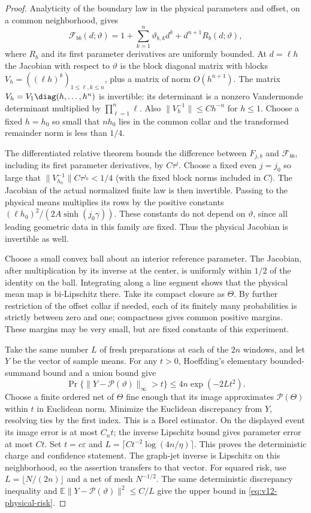 \begin{proof}
Analyticity of the boundary law in the physical parameters and offset,
on a common neighborhood, gives
\[
 \mathcal F_{bb}(d;\vartheta)
     =1+\sum_{k=1}^n\vartheta_{b,k}d^k
                            +d^{n+1}R_b(d;\vartheta),
\]
where $R_b$ and its first parameter derivatives are uniformly bounded.
At $d=\ell h$ the Jacobian with respect to $\vartheta$ is the block
diagonal matrix with blocks
$V_h=((\ell h)^k)_{1\le\ell,k\le n}$, plus a matrix of norm
$O(h^{n+1})$. The matrix $V_h=V_1\diag(h,\ldots,h^n)$ is
invertible: its determinant is a nonzero Vandermonde determinant
multiplied by $\prod_{\ell=1}^n\ell$. Also
$\|V_h^{-1}\|\le C h^{-n}$ for $h\le1$.
Choose a fixed $h=h_0$ so small that $nh_0$ lies in the common
collar and the transformed remainder norm is less than $1/4$.

The differentiated relative theorem bounds the difference between
$F_{j,b}$ and $\mathcal F_{bb}$, including its first parameter
derivatives, by $C\tau^j$. Choose a fixed even $j=j_0$ so large
that $\|V_{h_0}^{-1}\|C\tau^{j_0}<1/4$ (with the fixed block
norms included in $C$). The Jacobian of the actual normalized finite
law is then invertible. Passing to the physical means multiplies
its rows by the positive constants
$(\ell h_0)^2/(2A\sinh(j_0\gamma))$. These constants do not depend
on $\vartheta$, since all leading geometric data in this family are
fixed. Thus the physical Jacobian is invertible as well.

Choose a small convex ball about an interior reference parameter.
The Jacobian, after multiplication by its inverse at the center, is
uniformly within $1/2$ of the identity on the ball. Integrating along
a line segment shows that the physical mean map is bi-Lipschitz
there. Take its compact closure as $\Theta$. By further restriction
of the offset collar if needed, each of its finitely many probabilities
is strictly between zero and one; compactness gives common positive
margins. These margins may be very small, but are fixed constants of
this experiment.

Take the same number $L$ of fresh preparations at each of the $2n$
windows, and let $Y$ be the vector of sample means. For any $t>0$,
Hoeffding's elementary bounded-summand bound and a union bound give
\[
 \Pr\{\|Y-\mathcal P(\vartheta)\|_\infty>t\}
                         \le4n\exp(-2Lt^2).
\]
Choose a finite ordered net of $\Theta$ fine enough that its image
approximates $\mathcal P(\Theta)$ within $t$ in Euclidean norm.
Minimize the Euclidean discrepancy from $Y$, resolving ties by the
first index. This is a Borel estimator. On the displayed event its
image error is at most $C_n t$; the inverse Lipschitz bound gives
parameter error at most $Ct$. Set $t=c\varepsilon$ and
$L=\lceil Ct^{-2}\log(4n/\eta)\rceil$. This proves the deterministic
charge and confidence statement. The graph-jet inverse is Lipschitz
on this neighborhood, so the assertion transfers to that vector.
For squared risk, use $L=\lfloor N/(2n)\rfloor$ and a net of mesh
$N^{-1/2}$. The same deterministic discrepancy inequality and
$\mathbb E\|Y-\mathcal P(\vartheta)\|^2\le C/L$ give the upper
bound in \eqref{eq:v12-physical-risk}.


\end{proof}
